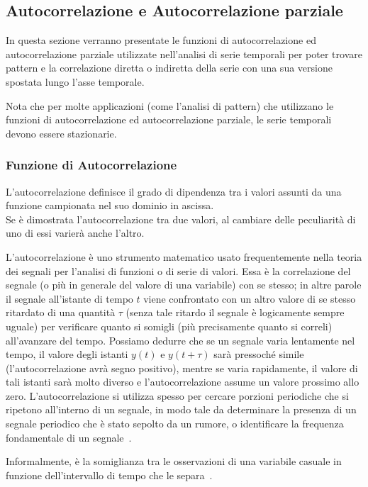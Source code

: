 \subsection{Autocorrelazione e Autocorrelazione parziale}
In questa sezione verranno presentate le funzioni di autocorrelazione ed autocorrelazione
parziale utilizzate nell'analisi di serie temporali per poter trovare pattern e la correlazione
diretta o indiretta della serie con una sua versione spostata lungo l'asse temporale.

Nota che per molte applicazioni (come l'analisi di pattern) che utilizzano le funzioni
di autocorrelazione ed autocorrelazione parziale, le serie temporali devono essere stazionarie.

\subsubsection{Funzione di Autocorrelazione}
L'autocorrelazione definisce il grado di dipendenza tra i valori assunti 
da una funzione campionata nel suo dominio in ascissa. \\
Se è dimostrata l'autocorrelazione tra due valori, al cambiare delle peculiarità 
di uno di essi varierà anche l'altro.

L'autocorrelazione è uno strumento matematico usato frequentemente nella teoria dei 
segnali per l'analisi di funzioni o di serie di valori. Essa è la correlazione 
del segnale (o più in generale del valore di una variabile) con se stesso; 
in altre parole il segnale all'istante di tempo $t$ viene confrontato con un altro valore 
di se stesso ritardato di una quantità 
$\tau$  (senza tale ritardo il segnale è logicamente sempre uguale) 
per verificare quanto si somigli (più precisamente quanto si correli) 
all'avanzare del tempo. Possiamo dedurre che se un segnale varia lentamente nel tempo, 
il valore degli istanti $y(t)$ e $y(t + \tau)$ sarà pressoché simile 
(l'autocorrelazione avrà segno positivo), mentre se varia rapidamente, 
il valore di tali istanti sarà molto diverso e l'autocorrelazione assume 
un valore prossimo allo zero. 
L'autocorrelazione si utilizza spesso per cercare porzioni periodiche che si ripetono 
all'interno di un segnale, in modo tale da determinare la presenza di un segnale 
periodico che è stato sepolto da un rumore, o identificare la frequenza fondamentale 
di un segnale~\cite{wiki:autcor_it}.

Informalmente, è la somiglianza tra le osservazioni di una variabile casuale 
in funzione dell'intervallo di tempo che le separa~\cite{wiki:autcor_en}.

